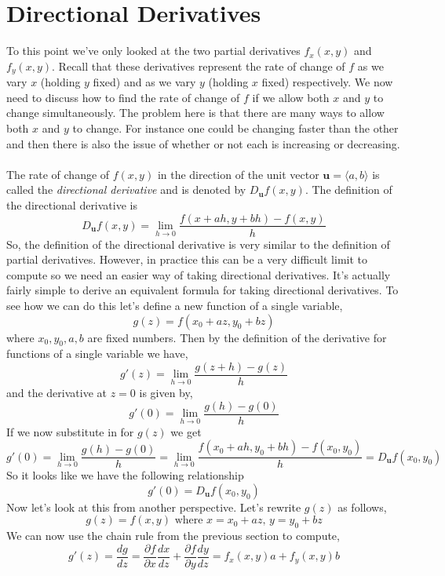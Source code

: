 \documentclass[10pt,reqno]{book}
\theoremstyle{definition}
\renewcommand{\vec}[1]{\mathbf{#1}}
\begin{document}
	\section{Directional Derivatives}
	
	To this point we've only looked at the two partial derivatives $ f_x(x,y) $ and $ f_y(x,y) $. Recall that these derivatives represent the rate of change of $ f $ as we vary $ x $ (holding $ y $ fixed) and as we vary $ y $ (holding $ x $ fixed) respectively. We now need to discuss how to find the rate of change of $ f $ if we allow both $ x $ and $ y $ to change simultaneously. The problem here is that there are many ways to allow both $ x $ and $ y $ to change. For instance one could be changing faster than the other and then there is also the issue of whether or not each is increasing or decreasing.\\ \\
	The rate of change of $ f(x,y) $ in the direction of the unit vector $ \vec{u} = \langle a,b \rangle $ is called the \textit{directional derivative} and is denoted by $ D_{\vec{u}} f(x,y)$. The definition of the directional derivative is
	\[ D_{\vec{u}} f(x,y) = \lim_{h \to 0} \frac{f(x+ah,y+bh) - f(x,y)}{h} \]
	So, the definition of the directional derivative is very similar to the definition of partial derivatives. However, in practice this can be a very difficult limit to compute so we need an easier way of taking directional derivatives. It's actually fairly simple to derive an equivalent formula for taking directional derivatives. To see how we can do this let's define a new function of a single variable,
	\[ g(z) = f(x_0+az,y_0+bz) \]
	where $ x_0,y_0,a,b $ are fixed numbers. Then by the definition of the derivative for functions of a single variable we have,
	\[ g'(z) = \lim_{h \to 0} \frac{g(z+h) - g(z)}{h} \]
	and the derivative at $ z = 0 $ is given by,
	\[ g'(0) = \lim_{h \to 0} \frac{g(h) - g(0)}{h} \]
	If we now substitute in for $ g(z) $ we get 
	\[ g'(0) = \lim_{h \to 0} \frac{g(h) - g(0)}{h} = \lim_{h \to 0} \frac{f(x_0+ah,y_0+bh) - f(x_0,y_0) }{h} = D_{\vec{u}} f(x_0,y_0) \]
	So it looks like we have the following relationship
	\begin{equation}
		g'(0) = D_{\vec{u}} f(x_0,y_0)
	\end{equation}
	Now let's look at this from another perspective. Let's rewrite $ g(z) $ as follows,
	\[ g(z) = f(x,y) \text{ where } x = x_0+az,\, y = y_0+bz \]
	We can now use the chain rule from the previous section to compute,
	\[ g'(z) = \frac{dg}{dz} = \frac{\partial f}{\partial x} \frac{dx}{dz} + \frac{\partial f}{\partial y} \frac{dy}{dz} = f_x(x,y)a + f_y(x,y)b \]
\end{document}
